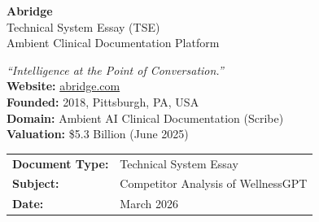 \documentclass[12pt,a4paper]{article}
\begin{document}
\begin{titlepage}
    \centering\vspace*{2cm}
    {\Huge\bfseries\color{primaryblue} Abridge}\\[0.5cm]
    {\Large\color{accentteal} Technical System Essay (TSE)}\\[0.3cm]
    {\large\color{darkgray} Ambient Clinical Documentation Platform}\\[2cm]

    \begin{mdframed}[backgroundcolor=lightgray, linecolor=primaryblue, linewidth=1.5pt, roundcorner=5pt]
        \centering\vspace{0.3cm}
        \textit{``Intelligence at the Point of Conversation.''}\\[0.3cm]
        \textbf{Website:} \href{https://abridge.com}{abridge.com}\\
        \textbf{Founded:} 2018, Pittsburgh, PA, USA\\
        \textbf{Domain:} Ambient AI Clinical Documentation (Scribe)\\
        \textbf{Valuation:} \$5.3 Billion (June 2025)\\
        \vspace{0.3cm}
    \end{mdframed}
    \vspace{2cm}
    \begin{tabular}{ll}
        \textbf{Document Type:} & Technical System Essay \\
        \textbf{Subject:}       & Competitor Analysis of WellnessGPT \\
        \textbf{Date:}          & March 2026 \\
    \end{tabular}
\end{titlepage}

\tableofcontents\newpage

\begin{abstract}
\noindent
This TSE provides a comprehensive analysis of \textbf{Abridge}, a leading generative AI platform for ambient clinical documentation. Abridge's core product is an AI ``scribe'' that listens to clinician-patient conversations and automatically generates structured clinical notes directly within Electronic Health Record (EHR) systems. It is analyzed as a key competitor to WellnessGPT in the healthcare AI space, with a focus on its unique architectural innovations, compliance framework, and strategic partnerships.
\end{abstract}
\newpage
\end{document}

